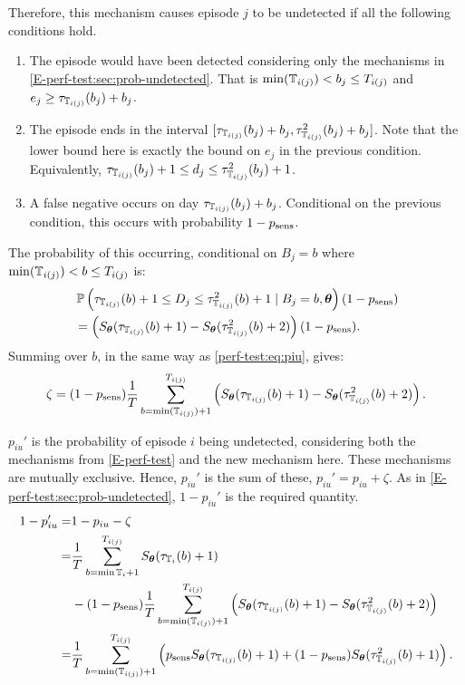 \documentclass[thesis.tex]{subfiles}
\begin{document}
Therefore, this mechanism causes episode $j$ to be undetected if all the following conditions hold.
\begin{enumerate}
    \item The episode would have been detected considering only the mechanisms in \cref{E-perf-test:sec:prob-undetected}. That is $\min(\mathbb{T}_{i(j)}) < b_j \leq T_{i(j)}$ and $e_j \geq \tau_{\mathbb{T}_{i(j)}}(b_j) + b_j$.
    \item The episode ends in the interval $[\tau_{\mathbb{T}_{i(j)}}(b_j) + b_j, \tau^2_{\mathbb{T}_{i(j)}}(b_j) + b_j]$.
      Note that the lower bound here is exactly the bound on $e_j$ in the previous condition.
      Equivalently, $\tau_{\mathbb{T}_{i(j)}}(b_j) + 1 \leq d_j \leq \tau^2_{\mathbb{T}_{i(j)}}(b_j) + 1$.
    \item A false negative occurs on day $\tau_{\mathbb{T}_{i(j)}}(b_j) + b_j$. Conditional on the previous condition, this occurs with probability $1 - p_\text{sens}$.
\end{enumerate}

The probability of this occurring, conditional on $B_j = b$ where $\min(\mathbb{T}_{i(j)}) < b \leq T_{i(j)}$ is:
\begin{align}
&\operatorname{\mathbb{P}} \left(
    \tau_{\mathbb{T}_{i(j)}}(b) + 1 \leq D_j \leq \tau^2_{\mathbb{T}_{i(j)}}(b) + 1
    \mid B_j = b, \bm{\theta} \right) (1 - p_\text{sens}) \\
&= \left( S_{\bm{\theta}}(\tau_{\mathbb{T}_{i(j)}}(b) + 1) - S_{\bm{\theta}}(\tau^2_{\mathbb{T}_{i(j)}}(b) + 2) \right) (1 - p_\text{sens}).
\end{align}
Summing over $b$, in the same way as \cref{perf-test:eq:piu}, gives:
\begin{align}
\zeta = (1 - p_\text{sens})\frac{1}{T} \sum_{b=\min(\mathbb{T}_{i(j)}) + 1}^{T_{i(j)}} \left( S_{\bm{\theta}}(\tau_{\mathbb{T}_{i(j)}}(b) + 1) - S_{\bm{\theta}}(\tau^2_{\mathbb{T}_{i(j)}}(b) + 2) \right).
\label{imperf-test:eq:zeta}
\end{align}

$p_{iu}'$ is the probability of episode $i$ being undetected, considering both the mechanisms from \cref{E-perf-test} and the new mechanism here.
These mechanisms are mutually exclusive.
Hence, $p_{iu}'$ is the sum of these, $p_{iu}' = p_{iu} + \zeta$.
As in \cref{E-perf-test:sec:prob-undetected}, $1 - p_{iu}'$ is the required quantity.
\begin{align}
1 - p_{iu}'
=& 1 - p_{iu} - \zeta \\
=& \frac{1}{T} \sum_{b = \min \mathbb{T}_{i} + 1}^{T_{i(j)}} S_{\bm{\theta}}(\tau_{\mathbb{T}_{i}}(b) + 1) \\
&- (1 - p_\text{sens})\frac{1}{T} \sum_{b=\min(\mathbb{T}_{i(j)}) + 1}^{T_{i(j)}} \left( S_{\bm{\theta}}(\tau_{\mathbb{T}_{i(j)}}(b) + 1) - S_{\bm{\theta}}(\tau^2_{\mathbb{T}_{i(j)}}(b) + 2) \right) \\
=& \frac{1}{T} \sum_{b=\min(\mathbb{T}_{i(j)}) + 1}^{T_{i(j)}} \left( p_\text{sens} S_{\bm{\theta}}(\tau_{\mathbb{T}_{i(j)}}(b) + 1) + (1 - p_\text{sens}) S_{\bm{\theta}}(\tau^2_{\mathbb{T}_{i(j)}}(b) + 1)\right).
\label{imperf-test:eq:pit-prime}
\end{align}
\end{document}
